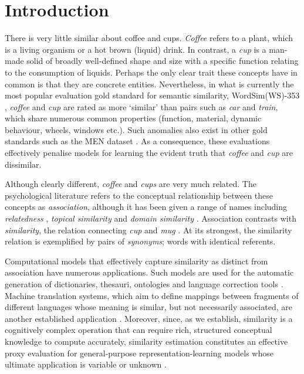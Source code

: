 \documentclass[fullname]{clv2}
\begin{document}
\section{Introduction}
There is very little similar about coffee and cups. \emph{Coffee} refers to a plant, which is a living organism or a hot brown (liquid) drink. In contrast, a \emph{cup} is a man-made solid of broadly well-defined shape and size with a specific function relating to the consumption of liquids. Perhaps the only clear trait these concepts have in common is that they are concrete entities. Nevertheless, in what is currently the most popular evaluation gold standard for semantic similarity, WordSim(WS)-353 \cite{finkelstein2001placing}, \emph{coffee} and \emph{cup} are rated  as more `similar' than pairs such as \emph{car} and \emph{train}, which share numerous common properties (function, material, dynamic behaviour, wheels, windows etc.). Such anomalies also exist in other gold standards such as the MEN dataset \cite{bruni2012distributional}. As a consequence, these evaluations effectively penalise models for learning the evident truth that \emph{coffee} and \emph{cup} are dissimilar. 

Although clearly different, \emph{coffee} and \emph{cups} are very much related. The psychological literature refers to the conceptual relationship between these concepts as \emph{association}, although it has been given a range of names including \emph{relatedness} \cite{budanitsky2006evaluating,agirre2009study}, \emph{topical similarity} \cite{hatzivassiloglou2001simfinder} and \emph{domain similarity} \cite{turney2012domain}. Association contrasts with \emph{similarity}, the relation connecting \emph{cup} and \emph{mug} \cite{tversky1977features}. At its strongest, the similarity relation is exemplified by pairs of \emph{synonyms}; words with identical referents.

Computational models that effectively capture similarity as distinct from association have numerous applications. Such models are used for the automatic generation of dictionaries, thesauri, ontologies and language correction tools \cite{cimiano2005learning,biemann2005ontology,li2006exploring}. Machine translation systems, which aim to define mappings between fragments of different languages whose meaning is similar, but not necessarily associated, are another established application \cite{he2008indirect,marton2009improved}. Moreover, since, as we establish, similarity is a cognitively complex operation that can require rich, structured conceptual knowledge to compute accurately, similarity estimation constitutes an effective proxy evaluation for general-purpose representation-learning models whose ultimate application is variable or unknown \cite{collobert:2008,baroni2010distributional}.
\end{document}

